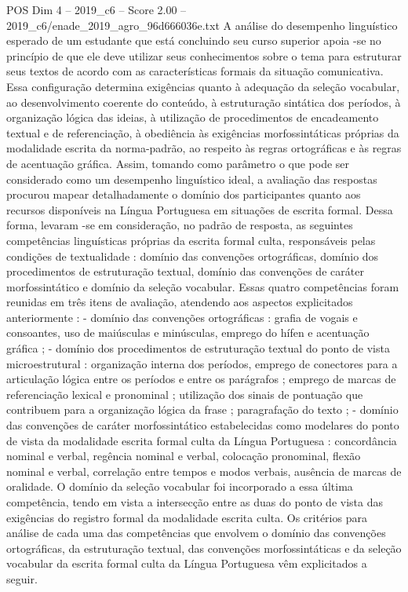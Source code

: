 \begin{textsample}{POS Dim 4 – 2019\_c6 – Score 2.00 – 2019\_c6/enade\_2019\_agro\_96d666036e.txt}
A análise do desempenho linguístico esperado de um estudante que está concluindo seu curso superior apoia -se no princípio de que ele deve utilizar seus conhecimentos sobre o tema para estruturar seus textos de acordo com as características formais da situação comunicativa.
Essa configuração determina exigências quanto à adequação da seleção vocabular, ao desenvolvimento coerente do conteúdo, à estruturação sintática dos períodos, à organização lógica das ideias, à utilização de procedimentos de encadeamento textual e de referenciação, à obediência às exigências morfossintáticas próprias da modalidade escrita da norma-padrão, ao respeito às regras ortográficas e às regras de acentuação gráfica.
Assim, tomando como parâmetro o que pode ser considerado como um desempenho linguístico ideal, a avaliação das respostas procurou mapear detalhadamente o domínio dos participantes quanto aos recursos disponíveis na Língua Portuguesa em situações de escrita formal.
Dessa forma, levaram -se em consideração, no padrão de resposta, as seguintes competências linguísticas próprias da escrita formal culta, responsáveis pelas condições de textualidade : domínio das convenções ortográficas, domínio dos procedimentos de estruturação textual, domínio das convenções de caráter morfossintático e domínio da seleção vocabular.
Essas quatro competências foram reunidas em três itens de avaliação, atendendo aos aspectos explicitados anteriormente : - domínio das convenções ortográficas : grafia de vogais e consoantes, uso de maiúsculas e minúsculas, emprego do hífen e acentuação gráfica ; - domínio dos procedimentos de estruturação textual do ponto de vista microestrutural : organização interna dos períodos, emprego de conectores para a articulação lógica entre os períodos e entre os parágrafos ; emprego de marcas de referenciação lexical e pronominal ; utilização dos sinais de pontuação que contribuem para a organização lógica da frase ; paragrafação do texto ; - domínio das convenções de caráter morfossintático estabelecidas como modelares do ponto de vista da modalidade escrita formal culta da Língua Portuguesa : concordância nominal e verbal, regência nominal e verbal, colocação pronominal, flexão nominal e verbal, correlação entre tempos e modos verbais, ausência de marcas de oralidade.
O domínio da seleção vocabular foi incorporado a essa última competência, tendo em vista a intersecção entre as duas do ponto de vista das exigências do registro formal da modalidade escrita culta.
Os critérios para análise de cada uma das competências que envolvem o domínio das convenções ortográficas, da estruturação textual, das convenções morfossintáticas e da seleção vocabular da escrita formal culta da Língua Portuguesa vêm explicitados a seguir.

\end{textsample}
